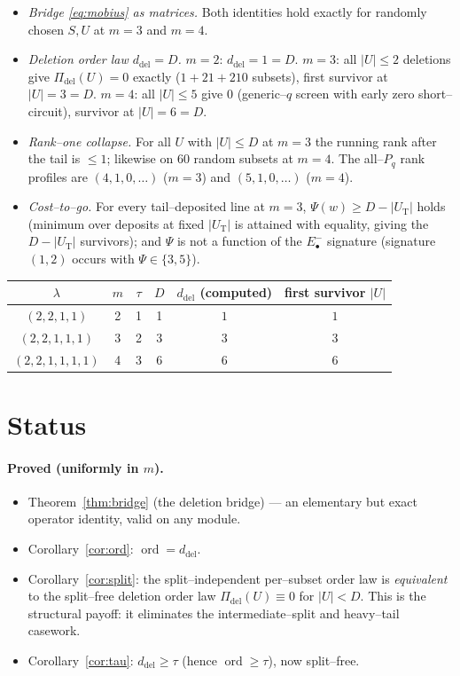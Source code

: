 \documentclass[11pt]{article}
\theoremstyle{definition}
\DeclareMathOperator{\ord}{ord}
\newcommand{\Em}[1]{E^{-}_{#1}}
\newcommand{\Pq}{P_{q}}
\newcommand{\Pdel}{\Pi_{\mathrm{del}}}
\newcommand{\ddel}{d_{\mathrm{del}}}
\begin{document}
\begin{itemize}[topsep=0.2em,itemsep=0.1em]
\item \emph{Bridge \eqref{eq:mobius} as matrices.} Both identities hold exactly for randomly
chosen $S,U$ at $m=3$ and $m=4$.
\item \emph{Deletion order law $\ddel=D$.} $m=2$: $\ddel=1=D$. $m=3$: all $|U|\le2$ deletions
give $\Pdel(U)=0$ exactly ($1+21+210$ subsets), first survivor at $|U|=3=D$. $m=4$: all $|U|\le5$
give $0$ (generic--$q$ screen with early zero short--circuit), survivor at $|U|=6=D$.
\item \emph{Rank--one collapse.} For all $U$ with $|U|\le D$ at $m=3$ the running rank after the
tail is $\le1$; likewise on $60$ random subsets at $m=4$. The all--$\Pq$ rank profiles are
$(4,1,0,\dots)$ ($m=3$) and $(5,1,0,\dots)$ ($m=4$).
\item \emph{Cost--to--go.} For every tail--deposited line at $m=3$, $\Psi(w)\ge D-|U_{\mathrm
T}|$ holds (minimum over deposits at fixed $|U_{\mathrm T}|$ is attained with equality, giving the
$D-|U_{\mathrm T}|$ survivors); and $\Psi$ is not a function of the $\Em\bullet$ signature
(signature $(1,2)$ occurs with $\Psi\in\{3,5\}$).
\end{itemize}

\begin{center}
\renewcommand{\arraystretch}{1.15}
\begin{tabular}{c|c|c|c|c|c}
\toprule
$\lambda$ & $m$ & $\tau$ & $D$ & $\ddel$ (computed) & first survivor $|U|$\\
\midrule
$(2,2,1,1)$     & 2 & 1 & 1 & $1$ & $1$\\
$(2,2,1,1,1)$   & 3 & 2 & 3 & $3$ & $3$\\
$(2,2,1,1,1,1)$ & 4 & 3 & 6 & $6$ & $6$\\
\bottomrule
\end{tabular}
\end{center}

\section{Status}\label{sec:status}

\paragraph{Proved (uniformly in $m$).}
\begin{itemize}[topsep=0.2em,itemsep=0.1em]
\item Theorem~\ref{thm:bridge} (the deletion bridge) --- an elementary but exact operator
identity, valid on any module.
\item Corollary~\ref{cor:ord}: $\ord=\ddel$.
\item Corollary~\ref{cor:split}: the split--independent per--subset order law is \emph{equivalent}
to the split--free deletion order law $\Pdel(U)\equiv0$ for $|U|<D$. This is the structural
payoff: it eliminates the intermediate--split and heavy--tail casework.
\item Corollary~\ref{cor:tau}: $\ddel\ge\tau$ (hence $\ord\ge\tau$), now split--free.
\end{itemize}
\end{document}
